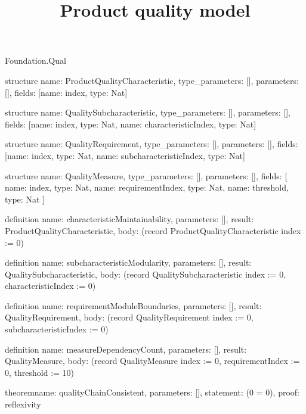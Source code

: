 \begin{lexlean}{Foundation.Qual}
\title{Product quality model}
\begin{semanticmodule}
structure{
  name: ProductQualityCharacteristic,
  type_parameters: [],
  parameters: [],
  fields: [{name: index, type: Nat}]
}

structure{
  name: QualitySubcharacteristic,
  type_parameters: [],
  parameters: [],
  fields: [{name: index, type: Nat}, {name: characteristicIndex, type: Nat}]
}

structure{
  name: QualityRequirement,
  type_parameters: [],
  parameters: [],
  fields: [{name: index, type: Nat}, {name: subcharacteristicIndex, type: Nat}]
}

structure{
  name: QualityMeasure,
  type_parameters: [],
  parameters: [],
  fields: [
    {name: index, type: Nat},
    {name: requirementIndex, type: Nat},
    {name: threshold, type: Nat}
  ]
}

definition{
  name: characteristicMaintainability,
  parameters: [],
  result: ProductQualityCharacteristic,
  body: (record ProductQualityCharacteristic {index := 0})
}

definition{
  name: subcharacteristicModularity,
  parameters: [],
  result: QualitySubcharacteristic,
  body: (record QualitySubcharacteristic {index := 0, characteristicIndex := 0})
}

definition{
  name: requirementModuleBoundaries,
  parameters: [],
  result: QualityRequirement,
  body: (record QualityRequirement {index := 0, subcharacteristicIndex := 0})
}

definition{
  name: measureDependencyCount,
  parameters: [],
  result: QualityMeasure,
  body: (record QualityMeasure {index := 0, requirementIndex := 0, threshold := 10})
}

theorem{name: qualityChainConsistent, parameters: [], statement: (0 = 0), proof: reflexivity{}}
\end{semanticmodule}
\end{lexlean}
